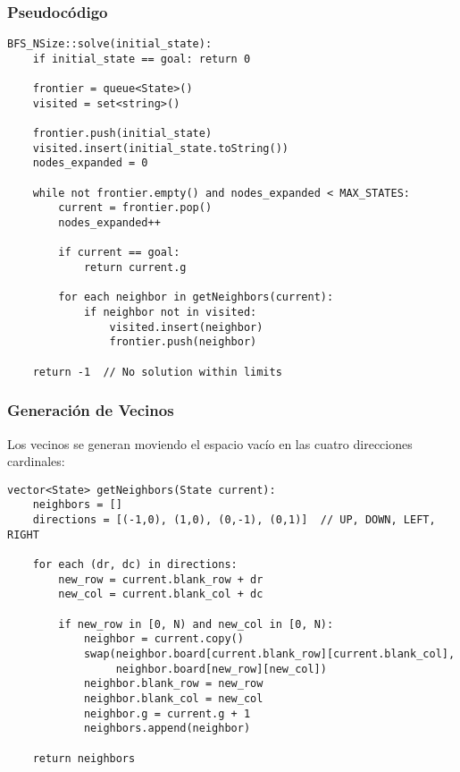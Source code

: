 \documentclass[12pt,a4paper]{article}
\begin{document}
\subsubsection{Pseudocódigo}

\begin{lstlisting}
BFS_NSize::solve(initial_state):
    if initial_state == goal: return 0
    
    frontier = queue<State>()
    visited = set<string>()
    
    frontier.push(initial_state)
    visited.insert(initial_state.toString())
    nodes_expanded = 0
    
    while not frontier.empty() and nodes_expanded < MAX_STATES:
        current = frontier.pop()
        nodes_expanded++
        
        if current == goal:
            return current.g
        
        for each neighbor in getNeighbors(current):
            if neighbor not in visited:
                visited.insert(neighbor)
                frontier.push(neighbor)
    
    return -1  // No solution within limits
\end{lstlisting}

\subsubsection{Generación de Vecinos}

Los vecinos se generan moviendo el espacio vacío en las cuatro direcciones cardinales:

\begin{lstlisting}
vector<State> getNeighbors(State current):
    neighbors = []
    directions = [(-1,0), (1,0), (0,-1), (0,1)]  // UP, DOWN, LEFT, RIGHT
    
    for each (dr, dc) in directions:
        new_row = current.blank_row + dr
        new_col = current.blank_col + dc
        
        if new_row in [0, N) and new_col in [0, N):
            neighbor = current.copy()
            swap(neighbor.board[current.blank_row][current.blank_col],
                 neighbor.board[new_row][new_col])
            neighbor.blank_row = new_row
            neighbor.blank_col = new_col
            neighbor.g = current.g + 1
            neighbors.append(neighbor)
    
    return neighbors
\end{lstlisting}
\end{document}
